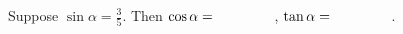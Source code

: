 \documentclass[nooutcomes]{ximera}
\begin{document}
%

\begin{problem}
Suppose $\sin\alpha = \frac{3}{5}$.  Then $\cos\alpha = \hspace{0.6in}$, $\tan\alpha = \hspace{0.6in}$.  
\end{problem}
\end{document}
